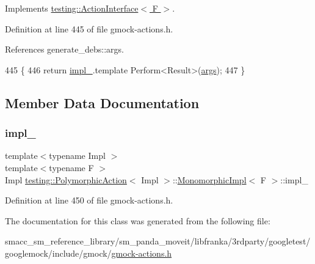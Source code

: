 Implements \hyperlink{classtesting_1_1ActionInterface_a20f8624fcea1786f2992b358760422a0}{testing\+::\+Action\+Interface$<$ F $>$}.



Definition at line 445 of file gmock-\/actions.\+h.



References generate\+\_\+debs\+::args.


\begin{DoxyCode}
445                                                       \{
446       \textcolor{keywordflow}{return} \hyperlink{classtesting_1_1PolymorphicAction_1_1MonomorphicImpl_a77375e13255f50b45498e0d9c2395d72}{impl\_}.template Perform<Result>(\hyperlink{namespacegenerate__debs_a75f9143e38df82d83b2e8a6f99cae02c}{args});
447     \}
\end{DoxyCode}


\subsection{Member Data Documentation}
\mbox{\label{classtesting_1_1PolymorphicAction_1_1MonomorphicImpl_a77375e13255f50b45498e0d9c2395d72}} 
\subsubsection{\texorpdfstring{impl\+\_\+}{impl\_}}
{\footnotesize\ttfamily template$<$typename Impl $>$ \\
template$<$typename F $>$ \\
Impl \hyperlink{classtesting_1_1PolymorphicAction}{testing\+::\+Polymorphic\+Action}$<$ Impl $>$\+::\hyperlink{classtesting_1_1PolymorphicAction_1_1MonomorphicImpl}{Monomorphic\+Impl}$<$ F $>$\+::impl\+\_\+\hspace{0.3cm}{\ttfamily [private]}}



Definition at line 450 of file gmock-\/actions.\+h.



The documentation for this class was generated from the following file\+:\begin{DoxyCompactItemize}
\item 
smacc\+\_\+sm\+\_\+reference\+\_\+library/sm\+\_\+panda\+\_\+moveit/libfranka/3rdparty/googletest/googlemock/include/gmock/\hyperlink{gmock-actions_8h}{gmock-\/actions.\+h}\end{DoxyCompactItemize}
